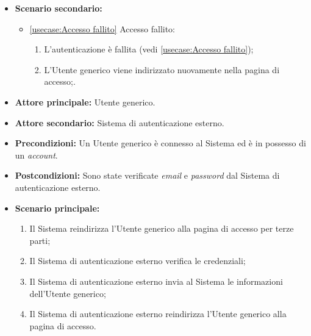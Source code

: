 \begin{itemize}
	\item \textbf{Scenario secondario:}
	\begin{itemize}
		\item \autoref{usecase:Accesso fallito} Accesso fallito:
		\begin{enumerate}
			\item L'autenticazione è fallita (vedi \autoref{usecase:Accesso fallito});
			\item L'Utente generico viene indirizzato nuovamente nella pagina di accesso;.
		\end{enumerate}	
	\end{itemize}

		

\end{itemize}

\label{usecase:Accesso per terze parti}
\begin{itemize}

	\item \textbf{Attore principale:} Utente generico.
	\item \textbf{Attore secondario:} Sistema di autenticazione esterno.

	\item \textbf{Precondizioni:} Un Utente generico è connesso al Sistema ed è in possesso di un \textit{account}.

	\item \textbf{Postcondizioni:} Sono state verificate \textit{email} e \textit{password} dal Sistema di autenticazione esterno.

	\item \textbf{Scenario principale:}
	\begin{enumerate}
		\item Il Sistema reindirizza l'Utente generico alla pagina di accesso per terze parti;
		\item Il Sistema di autenticazione esterno verifica le credenziali;
		\item Il Sistema di autenticazione esterno invia al Sistema le informazioni dell'Utente generico;
		\item Il Sistema di autenticazione esterno reindirizza l'Utente generico alla pagina di accesso.
	\end{enumerate}
	
\end{itemize}

